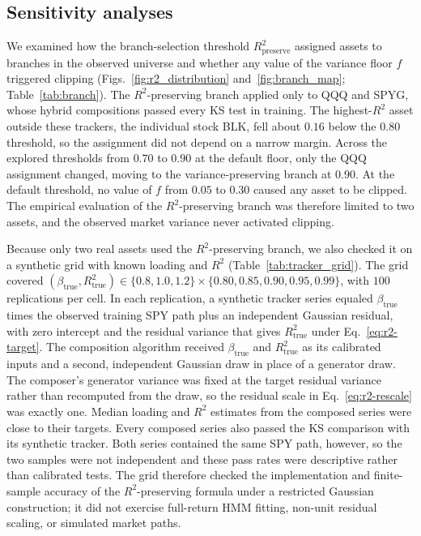 
\subsection{Sensitivity analyses}

We examined how the branch-selection threshold
$R^2_{\mathrm{preserve}}$ assigned assets to branches in the observed
universe and whether any value of the variance floor $f$ triggered
clipping (Figs.~\ref{fig:r2_distribution}
and~\ref{fig:branch_map}; Table~\ref{tab:branch}). The
$R^2$-preserving branch applied only to QQQ and SPYG, whose hybrid
compositions passed every KS test in training. The highest-$R^2$ asset
outside these trackers, the individual stock BLK, fell about $0.16$
below the $0.80$ threshold, so the assignment did not depend on a
narrow margin. Across the explored thresholds from $0.70$ to $0.90$ at
the default floor, only the QQQ assignment changed, moving to the
variance-preserving branch at $0.90$. At the default threshold, no
value of $f$ from $0.05$ to $0.30$ caused any asset to be clipped. The
empirical evaluation of the $R^2$-preserving branch was therefore
limited to two assets, and the observed market variance never
activated clipping.

Because only two real assets used the $R^2$-preserving branch, we also
checked it on a synthetic grid with known loading and $R^2$
(Table~\ref{tab:tracker_grid}). The grid covered
$(\beta_{\mathrm{true}},R^2_{\mathrm{true}})\in\{0.8,1.0,1.2\}
\times\{0.80,0.85,0.90,0.95,0.99\}$, with $100$ replications per cell.
In each replication, a synthetic tracker series equaled
$\beta_{\mathrm{true}}$ times the observed training SPY path plus an
independent Gaussian residual, with zero intercept and the residual
variance that gives $R^2_{\mathrm{true}}$ under
Eq.~\eqref{eq:r2-target}. The composition algorithm received
$\beta_{\mathrm{true}}$ and $R^2_{\mathrm{true}}$ as its calibrated
inputs and a second, independent Gaussian draw in place of a generator
draw. The composer's generator variance was fixed at the target
residual variance rather than recomputed from the draw, so the
residual scale in Eq.~\eqref{eq:r2-rescale} was exactly one. Median
loading and $R^2$ estimates from the composed series were close to
their targets. Every composed series also passed the KS comparison
with its synthetic tracker. Both series contained the same SPY path,
however, so the two samples were not independent and these pass rates
were descriptive rather than calibrated tests. The grid therefore
checked the implementation and finite-sample accuracy of the
$R^2$-preserving formula under a restricted Gaussian construction; it
did not exercise full-return HMM fitting, non-unit residual scaling,
or simulated market paths.

